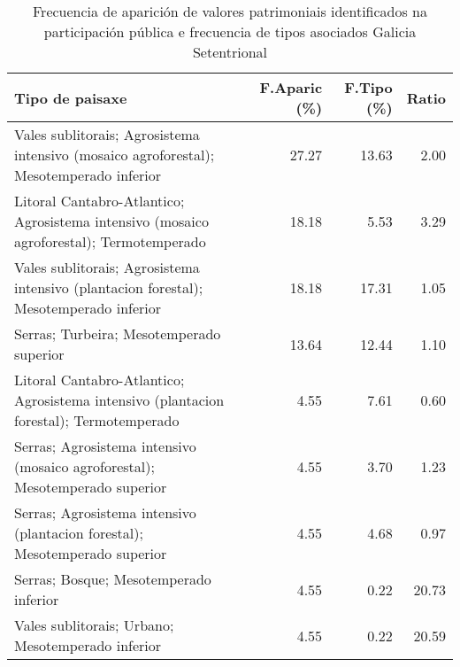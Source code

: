 \begin{table}[p]
\centering
\caption{Frecuencia de aparición de valores patrimoniais identificados na participación pública e frecuencia de tipos asociados Galicia Setentrional} 
\label{vsixotpat10}
\begin{tabular}{lrrr}
  \hline
Tipo de paisaxe & F.Aparic (\%) & F.Tipo (\%) & Ratio \\ 
  \hline
Vales sublitorais; Agrosistema intensivo (mosaico agroforestal); Mesotemperado inferior & 27.27 & 13.63 & 2.00 \\ 
  Litoral Cantabro-Atlantico; Agrosistema intensivo (mosaico agroforestal); Termotemperado & 18.18 & 5.53 & 3.29 \\ 
  Vales sublitorais; Agrosistema intensivo (plantacion forestal); Mesotemperado inferior & 18.18 & 17.31 & 1.05 \\ 
  Serras; Turbeira; Mesotemperado superior & 13.64 & 12.44 & 1.10 \\ 
  Litoral Cantabro-Atlantico; Agrosistema intensivo (plantacion forestal); Termotemperado & 4.55 & 7.61 & 0.60 \\ 
  Serras; Agrosistema intensivo (mosaico agroforestal); Mesotemperado superior & 4.55 & 3.70 & 1.23 \\ 
  Serras; Agrosistema intensivo (plantacion forestal); Mesotemperado superior & 4.55 & 4.68 & 0.97 \\ 
  Serras; Bosque; Mesotemperado inferior & 4.55 & 0.22 & 20.73 \\ 
  Vales sublitorais; Urbano; Mesotemperado inferior & 4.55 & 0.22 & 20.59 \\ 
   \hline
\end{tabular}
\end{table}
